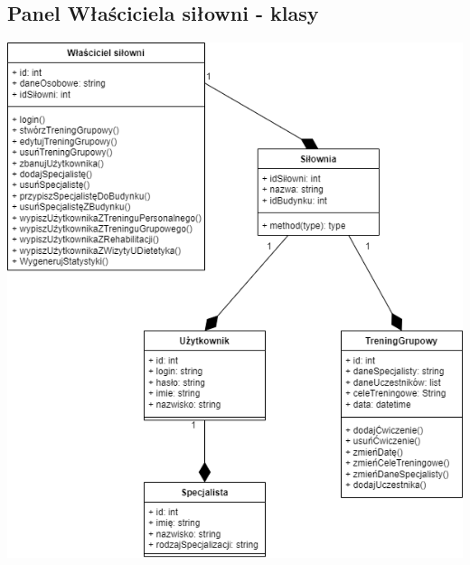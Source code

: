 \subsection{Panel Właściciela siłowni - klasy}\label{subsec:panel-wlasciciela-silowni-classes}

\includegraphics{../diagrams/class/wlasciciel_silowni}